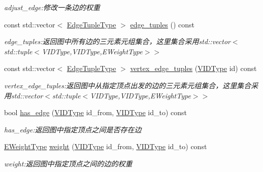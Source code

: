 \begin{DoxyCompactItemize}
\begin{DoxyCompactList}\small\item\em adjust\+\_\+edge\+:修改一条边的权重 \end{DoxyCompactList}\item 
const std\+::vector$<$ \hyperlink{struct_introduction_to_algorithm_1_1_graph_algorithm_1_1_matrix_graph_ad698e07bacdb3f332c4f5d34bdb49463}{Edge\+Tuple\+Type} $>$ \hyperlink{struct_introduction_to_algorithm_1_1_graph_algorithm_1_1_matrix_graph_a2bad3638c9ecb614f65b19fe155f5cd7}{edge\+\_\+tuples} () const 
\begin{DoxyCompactList}\small\item\em edge\+\_\+tuples\+:返回图中所有边的三元素元组集合，这里集合采用{\ttfamily std\+::vector$<$std\+::tuple$<$V\+I\+D\+Type,V\+I\+D\+Type,E\+Weight\+Type$>$$>$} \end{DoxyCompactList}\item 
const std\+::vector$<$ \hyperlink{struct_introduction_to_algorithm_1_1_graph_algorithm_1_1_matrix_graph_ad698e07bacdb3f332c4f5d34bdb49463}{Edge\+Tuple\+Type} $>$ \hyperlink{struct_introduction_to_algorithm_1_1_graph_algorithm_1_1_matrix_graph_a906d21b803bfae5095066df1e31c891c}{vertex\+\_\+edge\+\_\+tuples} (\hyperlink{struct_introduction_to_algorithm_1_1_graph_algorithm_1_1_matrix_graph_ae97378c88e8d65a880334f31a352e71d}{V\+I\+D\+Type} id) const 
\begin{DoxyCompactList}\small\item\em vertex\+\_\+edge\+\_\+tuples\+:返回图中从指定顶点出发的边的三元素元组集合，这里集合采用{\ttfamily std\+::vector$<$std\+::tuple$<$V\+I\+D\+Type,V\+I\+D\+Type,E\+Weight\+Type$>$$>$} \end{DoxyCompactList}\item 
bool \hyperlink{struct_introduction_to_algorithm_1_1_graph_algorithm_1_1_matrix_graph_ab5eb0a563c39a088d16e349cb3d73a2d}{has\+\_\+edge} (\hyperlink{struct_introduction_to_algorithm_1_1_graph_algorithm_1_1_matrix_graph_ae97378c88e8d65a880334f31a352e71d}{V\+I\+D\+Type} id\+\_\+from, \hyperlink{struct_introduction_to_algorithm_1_1_graph_algorithm_1_1_matrix_graph_ae97378c88e8d65a880334f31a352e71d}{V\+I\+D\+Type} id\+\_\+to) const 
\begin{DoxyCompactList}\small\item\em has\+\_\+edge\+:返回图中指定顶点之间是否存在边 \end{DoxyCompactList}\item 
\hyperlink{struct_introduction_to_algorithm_1_1_graph_algorithm_1_1_matrix_graph_af54dbf6d171b89b81b490de13f1fb02f}{E\+Weight\+Type} \hyperlink{struct_introduction_to_algorithm_1_1_graph_algorithm_1_1_matrix_graph_a9304b6a4c45f368452f6ff9065334536}{weight} (\hyperlink{struct_introduction_to_algorithm_1_1_graph_algorithm_1_1_matrix_graph_ae97378c88e8d65a880334f31a352e71d}{V\+I\+D\+Type} id\+\_\+from, \hyperlink{struct_introduction_to_algorithm_1_1_graph_algorithm_1_1_matrix_graph_ae97378c88e8d65a880334f31a352e71d}{V\+I\+D\+Type} id\+\_\+to) const 
\begin{DoxyCompactList}\small\item\em weight\+:返回图中指定顶点之间的边的权重 \end{DoxyCompactList}\end{DoxyCompactItemize}
